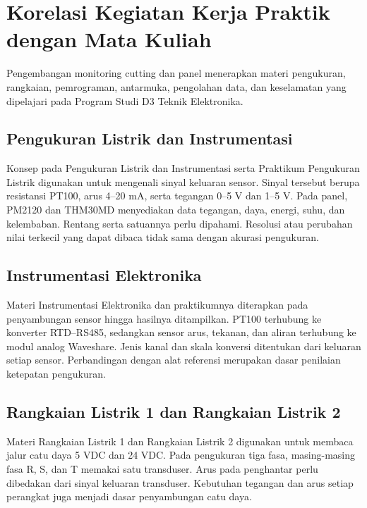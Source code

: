 \section{Korelasi Kegiatan Kerja Praktik dengan Mata Kuliah}

Pengembangan monitoring cutting dan panel menerapkan materi pengukuran, rangkaian, pemrograman, antarmuka, pengolahan data, dan keselamatan yang dipelajari pada Program Studi D3 Teknik Elektronika.

\begingroup
\titlespacing*{\subsection}{0pt}{4pt}{2pt}
\subsection{Pengukuran Listrik dan Instrumentasi}

Konsep pada Pengukuran Listrik dan Instrumentasi serta Praktikum Pengukuran Listrik digunakan untuk mengenali sinyal keluaran sensor. Sinyal tersebut berupa resistansi PT100, arus 4--20 mA, serta tegangan 0--5 V dan 1--5 V. Pada panel, PM2120 dan THM30MD menyediakan data tegangan, daya, energi, suhu, dan kelembaban. Rentang serta satuannya perlu dipahami. Resolusi atau perubahan nilai terkecil yang dapat dibaca tidak sama dengan akurasi pengukuran.

\subsection{Instrumentasi Elektronika}

Materi Instrumentasi Elektronika dan praktikumnya diterapkan pada penyambungan sensor hingga hasilnya ditampilkan. PT100 terhubung ke konverter RTD--RS485, sedangkan sensor arus, tekanan, dan aliran terhubung ke modul analog Waveshare. Jenis kanal dan skala konversi ditentukan dari keluaran setiap sensor. Perbandingan dengan alat referensi merupakan dasar penilaian ketepatan pengukuran.

\subsection{Rangkaian Listrik 1 dan Rangkaian Listrik 2}

Materi Rangkaian Listrik 1 dan Rangkaian Listrik 2 digunakan untuk membaca jalur catu daya 5 VDC dan 24 VDC. Pada pengukuran tiga fasa, masing-masing fasa R, S, dan T memakai satu transduser. Arus pada penghantar perlu dibedakan dari sinyal keluaran transduser. Kebutuhan tegangan dan arus setiap perangkat juga menjadi dasar penyambungan catu daya.


